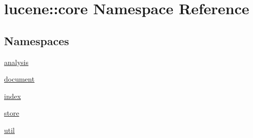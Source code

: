 \hypertarget{namespacelucene_1_1core}{}\section{lucene\+:\+:core Namespace Reference}
\label{namespacelucene_1_1core}
\subsection*{Namespaces}
\begin{DoxyCompactItemize}
\item 
 \mbox{\hyperlink{namespacelucene_1_1core_1_1analysis}{analysis}}
\item 
 \mbox{\hyperlink{namespacelucene_1_1core_1_1document}{document}}
\item 
 \mbox{\hyperlink{namespacelucene_1_1core_1_1index}{index}}
\item 
 \mbox{\hyperlink{namespacelucene_1_1core_1_1store}{store}}
\item 
 \mbox{\hyperlink{namespacelucene_1_1core_1_1util}{util}}
\end{DoxyCompactItemize}
